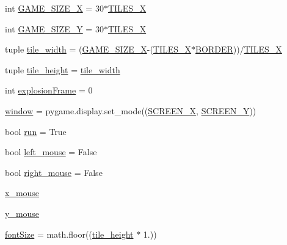 \begin{DoxyCompactItemize}
\item 
int \mbox{\hyperlink{namespaceminesweeper_a46d8139d06a5719868fc00cba651c8ff}{G\+A\+M\+E\+\_\+\+S\+I\+Z\+E\+\_\+X}} = 30$\ast$\mbox{\hyperlink{namespaceminesweeper_ac9707e38bc10ae8def8674e284754df2}{T\+I\+L\+E\+S\+\_\+X}}
\item 
int \mbox{\hyperlink{namespaceminesweeper_a9a2cdb7107890f2ec70e23210fe06775}{G\+A\+M\+E\+\_\+\+S\+I\+Z\+E\+\_\+Y}} = 30$\ast$\mbox{\hyperlink{namespaceminesweeper_ac9707e38bc10ae8def8674e284754df2}{T\+I\+L\+E\+S\+\_\+X}}
\item 
tuple \mbox{\hyperlink{namespaceminesweeper_a528cb94bc9f0e9a64f2923e0414591ed}{tile\+\_\+width}} = (\mbox{\hyperlink{namespaceminesweeper_a46d8139d06a5719868fc00cba651c8ff}{G\+A\+M\+E\+\_\+\+S\+I\+Z\+E\+\_\+X}}-\/(\mbox{\hyperlink{namespaceminesweeper_ac9707e38bc10ae8def8674e284754df2}{T\+I\+L\+E\+S\+\_\+X}}$\ast$\mbox{\hyperlink{namespaceminesweeper_a3324cf634218bea0300a16ea394866bf}{B\+O\+R\+D\+ER}}))/\mbox{\hyperlink{namespaceminesweeper_ac9707e38bc10ae8def8674e284754df2}{T\+I\+L\+E\+S\+\_\+X}}
\item 
tuple \mbox{\hyperlink{namespaceminesweeper_a033197bb6aa4149287e9c4fcdeff7d96}{tile\+\_\+height}} = \mbox{\hyperlink{namespaceminesweeper_a528cb94bc9f0e9a64f2923e0414591ed}{tile\+\_\+width}}
\item 
int \mbox{\hyperlink{namespaceminesweeper_a9958c61bcddc97972e42fc95a835576c}{explosion\+Frame}} = 0
\item 
\mbox{\hyperlink{namespaceminesweeper_a80cc81c5aa455fb1b4762add4b4d730c}{window}} = pygame.\+display.\+set\+\_\+mode((\mbox{\hyperlink{namespaceminesweeper_a1844cce3a8aa0b80dce337b5f39dedfb}{S\+C\+R\+E\+E\+N\+\_\+X}}, \mbox{\hyperlink{namespaceminesweeper_ab648a812026dc7c97d7267459db82451}{S\+C\+R\+E\+E\+N\+\_\+Y}}))
\item 
bool \mbox{\hyperlink{namespaceminesweeper_a1c6096cb2d5d85959a0c2269fb507cd1}{run}} = True
\item 
bool \mbox{\hyperlink{namespaceminesweeper_afe681c4dafd3b5d1a4673343b0d8becd}{left\+\_\+mouse}} = False
\item 
bool \mbox{\hyperlink{namespaceminesweeper_a92b515842d4c2176160596ab41fcbb83}{right\+\_\+mouse}} = False
\item 
\mbox{\hyperlink{namespaceminesweeper_adaf47cada95be72930593f66a3c364ab}{x\+\_\+mouse}}
\item 
\mbox{\hyperlink{namespaceminesweeper_a4cf3d5544c4ecea8c9460a208a293aa3}{y\+\_\+mouse}}
\item 
\mbox{\hyperlink{namespaceminesweeper_a8d7e0edcef8465377296847bc7110ada}{font\+Size}} = math.\+floor((\mbox{\hyperlink{namespaceminesweeper_a033197bb6aa4149287e9c4fcdeff7d96}{tile\+\_\+height}} $\ast$ 1.))

\end{DoxyCompactItemize}
